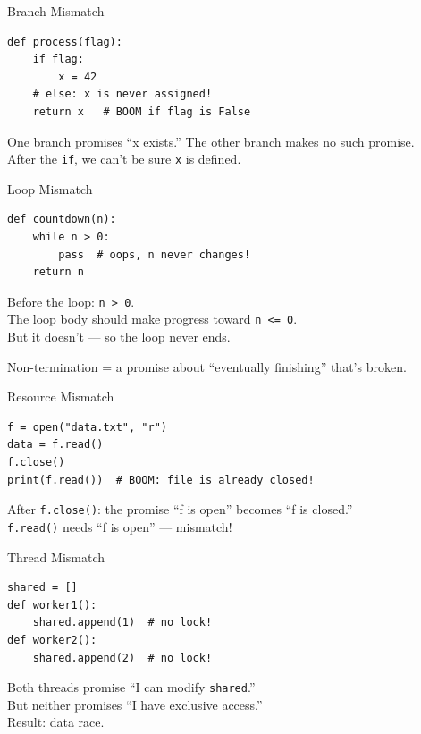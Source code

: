 \documentclass[aspectratio=169,10pt]{beamer}
\newcommand{\warn}[1]{\begin{center}
  \colorbox{warnbg}{\parbox{0.88\textwidth}{\centering\small #1}}\end{center}}
\begin{document}
\begin{frame}[fragile]{Branch Mismatch}
\begin{lstlisting}
def process(flag):
    if flag:
        x = 42
    # else: x is never assigned!
    return x   # BOOM if flag is False
\end{lstlisting}
\vspace{0.3em}
One branch promises ``x exists.'' The other branch makes no such promise.\\
After the \texttt{if}, we can't be sure \texttt{x} is defined.
\end{frame}

\begin{frame}[fragile]{Loop Mismatch}
\begin{lstlisting}
def countdown(n):
    while n > 0:
        pass  # oops, n never changes!
    return n
\end{lstlisting}
\vspace{0.3em}
Before the loop: \texttt{n > 0}.\\
The loop body should make progress toward \texttt{n <= 0}.\\
But it doesn't --- so the loop never ends.
\warn{Non-termination = a promise about ``eventually finishing'' that's broken.}
\end{frame}

\begin{frame}[fragile]{Resource Mismatch}
\begin{lstlisting}
f = open("data.txt", "r")
data = f.read()
f.close()
print(f.read())  # BOOM: file is already closed!
\end{lstlisting}
\vspace{0.3em}
After \texttt{f.close()}: the promise ``f is open'' becomes ``f is closed.''\\
\texttt{f.read()} needs ``f is open'' --- mismatch!
\end{frame}

\begin{frame}[fragile]{Thread Mismatch}
\begin{lstlisting}
shared = []
def worker1():
    shared.append(1)  # no lock!
def worker2():
    shared.append(2)  # no lock!
\end{lstlisting}
\vspace{0.3em}
Both threads promise ``I can modify \texttt{shared}.''\\
But neither promises ``I have exclusive access.''\\
Result: data race.
\end{frame}
\end{document}
